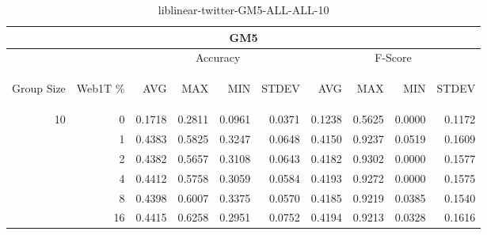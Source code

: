 \begin{center}
\begin{table}[htbp]
\begin{tabular}{ | r | r | r | r | r | r | r | r | r | r |}
\hline
\multicolumn{10}{|c|}{GM5}\\
\hline
 & & \multicolumn{4}{|c|}{Accuracy} & \multicolumn{4}{|c|}{F-Score}\\ \cline{3-10}
\begin{sideways}Group Size\end{sideways} & \begin{sideways}Web1T \%\end{sideways} & \begin{sideways}AVG\end{sideways} & \begin{sideways}MAX\end{sideways} & \begin{sideways}MIN\end{sideways} & \begin{sideways}STDEV\end{sideways} & \begin{sideways}AVG\end{sideways} & \begin{sideways}MAX\end{sideways} & \begin{sideways}MIN\end{sideways} & \begin{sideways}STDEV\end{sideways}\\
\hline
\multirow{6}{*}{10}
 & 0 & 0.1718 & 0.2811 & 0.0961 & 0.0371 & 0.1238 & 0.5625 & 0.0000 & 0.1172\\ \cline{2-10}
 & 1 & 0.4383 & 0.5825 & 0.3247 & 0.0648 & 0.4150 & 0.9237 & 0.0519 & 0.1609\\ \cline{2-10}
 & 2 & 0.4382 & 0.5657 & 0.3108 & 0.0643 & 0.4182 & 0.9302 & 0.0000 & 0.1577\\ \cline{2-10}
 & 4 & 0.4412 & 0.5758 & 0.3059 & 0.0584 & 0.4193 & 0.9272 & 0.0000 & 0.1575\\ \cline{2-10}
 & 8 & 0.4398 & 0.6007 & 0.3375 & 0.0570 & 0.4185 & 0.9219 & 0.0385 & 0.1540\\ \cline{2-10}
 & 16 & 0.4415 & 0.6258 & 0.2951 & 0.0752 & 0.4194 & 0.9213 & 0.0328 & 0.1616\\ \cline{2-10}
\hline
\end{tabular}
\caption{liblinear-twitter-GM5-ALL-ALL-10}
\end{table}
\end{center}

